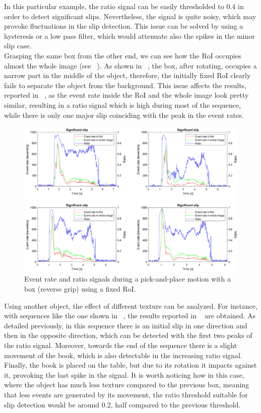 In this particular example, the ratio signal can be easily thresholded to 0.4 in order to detect significant slips. Nevertheless, the signal is quite noisy, which may provoke fluctuations in the slip detection. This issue can be solved by using a hysteresis or a low pass filter, which would attenuate also the spikes in the minor slip case.\\

Grasping the same box from the other end, we can see how the RoI occupies almost the whole image (see ~). As shown in ~, the box, after rotating, occupies a narrow part in the middle of the object, therefore, the initially fixed RoI clearly fails to separate the object from the background. This issue affects the results, reported in ~, as the event rate inside the RoI and the whole image look pretty similar, resulting in a ratio signal which is high during most of the sequence, while there is only one major slip coinciding with the peak in the event rates.

\begin{figure}[h]
    \centering
    \includegraphics[width=\textwidth]{resources/images/fix_roi_set_rev}
    \caption{Event rate and ratio signals during a pick-and-place motion with a box (reverse grip) using a fixed RoI.}\label{fig:fix_roi_set_rev}
\end{figure}

Using another object, the effect of different texture can be analyzed. For instance, with sequences like the one shown in ~, the results reported in ~ are obtained. As detailed previously, in this sequence there is an initial slip in one direction and then in the opposite direction, which can be detected with the first two peaks of the ratio signal. Moreover, towards the end of the sequence there is a slight movement of the book, which is also detectable in the increasing ratio signal. Finally, the book is placed on the table, but due to its rotation it impacts against it, provoking the last spike in the signal. It is worth noticing how in this case, where the object has much less texture compared to the previous box, meaning that less events are generated by its movement, the ratio threshold suitable for slip detection would be around 0.2, half compared to the previous threshold.


